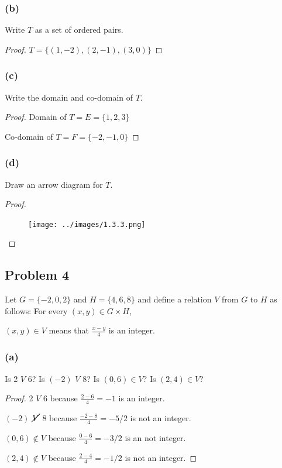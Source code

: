 \documentclass[14pt]{extarticle}
\newcommand{\dps}{\displaystyle}
\begin{document}
\subsubsection{(b)}
Write $T$ as a set of ordered pairs.

\begin{proof}
    $T = \{(1, -2), (2, -1), (3, 0)\}$
\end{proof}

\subsubsection{(c)}
Write the domain and co-domain of $T$.

\begin{proof}
    Domain of $T = E = \{1, 2, 3\}$

    Co-domain of $T = F = \{-2, -1, 0\}$
\end{proof}

\subsubsection{(d)}
Draw an arrow diagram for $T$.

\begin{proof}
    \begin{figure}[ht!]
        \centering
        \texttt{[image: ../images/1.3.3.png]}
    \end{figure}
\end{proof}

\subsection{Problem 4}
Let $G = \{-2, 0, 2\}$ and $H = \{4, 6, 8\}$ and define a relation $V$ from
$G$ to $H$ as follows: For every $(x, y) \in G \times H$,

\begin{center}
    $(x, y) \in V$ means that $\dps\frac{x-y}{4}$ is an integer.
\end{center}

\subsubsection{(a)}
Is 2 $V$ 6? Is $(-2)$ $V$ 8? Is $(0, 6) \in V$? Is $(2, 4) \in V$?

\begin{proof}
    2 $V$ 6 because $\dps\frac{2-6}{4} = -1$ is an integer.

    $(-2)$ $\cancel{V}$ 8 because $\dps\frac{-2-8}{4} = -5/2$ is not an integer.

    $(0, 6) \notin V$ because $\dps\frac{0-6}{4} = -3/2$ is an not integer.

    $(2, 4) \notin V$ because $\dps\frac{2-4}{4} = -1/2$ is not an integer.

\end{proof}
\end{document}
